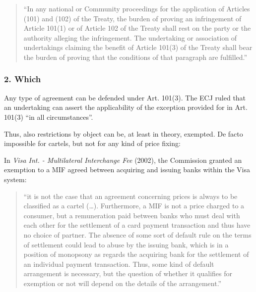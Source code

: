             \begin{quote}
            “In any national or Community proceedings for the application of Articles (101) and (102) of the Treaty, the burden of proving an infringement of Article 101(1) or of Article 102 of the Treaty shall rest on the party or the authority alleging the infringement. The undertaking or association of undertakings claiming the benefit of Article 101(3) of the Treaty shall bear the burden of proving that the conditions of that paragraph are fulfilled.”
            \end{quote}

        \subsubsection{2. Which}

            Any type of agreement can be defended under Art. 101(3). The ECJ ruled that an undertaking can assert the applicability of the exception provided for in Art. 101(3) “in all circumstances”.

            Thus, also restrictions by object can be, at least in theory, exempted. De facto impossible for cartels, but not for any kind of price fixing:
            
            In \textit{Visa Int. - Multilateral Interchange Fee} (2002), the Commission granted an exemption to a MIF agreed between acquiring and issuing banks within the Visa system:
            \begin{quote}
            “it is not the case that an agreement concerning prices is always to be classified as a cartel (…). Furthermore, a MIF is not a price charged to a consumer, but a remuneration paid between banks who must deal with each other for the settlement of a card payment transaction and thus have no choice of partner. The absence of some sort of default rule on the terms of settlement could lead to abuse by the issuing bank, which is in a position of monopsony as regards the acquiring bank for the settlement of an individual payment transaction. Thus, some kind of default arrangement is necessary, but the question of whether it qualifies for exemption or not will depend on the details of the arrangement.”
            \end{quote}

